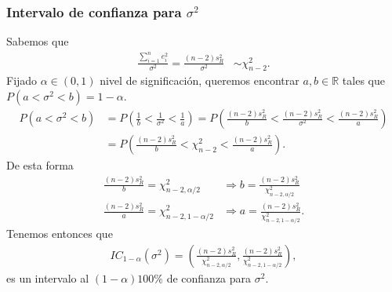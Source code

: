 \subsubsection{Intervalo de confianza para $\sigma^2$}
\noindent Sabemos que
\begin{align*}
    \frac{\sum_{i=1}^{n} e_i^2}{\sigma^2} = \frac{(n-2)s_R^2}{\sigma^2} &\sim \chi_{n-2}^2.
\end{align*}
Fijado $\alpha \in (0,1)$ nivel de significación, queremos encontrar $a,b \in \mathbb{R}$ tales que $P(a < \sigma^2 < b) = 1 - \alpha$.
\begin{align*}
    P(a < \sigma^2 < b) &= P\left( \frac{1}{b} < \frac{1}{\sigma^2} < \frac{1}{a} \right) = P\left( \frac{(n-2)s_R^2}{b} < \frac{(n-2)s_R^2}{\sigma^2} < \frac{(n-2)s_R^2}{a} \right) \\
    &= P\left( \frac{(n-2)s_R^2}{b} < \chi_{n-2}^2 < \frac{(n-2)s_R^2}{a} \right).
\end{align*}
De esta forma
\begin{align*}
    \frac{(n-2)s_R^2}{b} = \chi_{n-2,\alpha/2}^2 &\Longrightarrow b = \frac{(n-2)s_R^2}{\chi_{n-2,\alpha/2}^2} \\
    \frac{(n-2)s_R^2}{a} = \chi_{n-2,1-\alpha/2}^2 &\Longrightarrow a= \frac{(n-2)s_R^2}{\chi_{n-2,1-\alpha/2}^2}.
\end{align*}
Tenemos entonces que
\begin{align*}
    IC_{1-\alpha}(\sigma^2) = \left(\frac{(n-2)s_R^2}{\chi_{n-2,\alpha/2}^2}, \frac{(n-2)s_R^2}{\chi_{n-2,1-\alpha/2}^2} \right),
\end{align*}
es un intervalo al $(1-\alpha)100 \%$ de confianza para $\sigma^2$.

